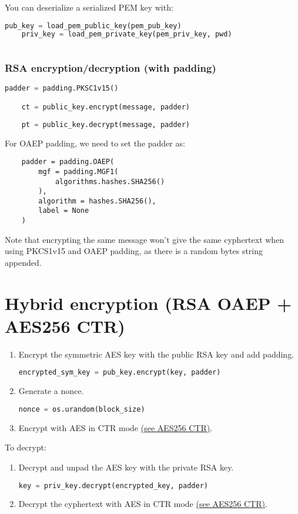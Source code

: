 \documentclass[a4paper, 12 pt]{memoir}
\begin{document}
You can deserialize a serialized PEM key with:
\begin{lstlisting}[language=Python]
    pub_key = load_pem_public_key(pem_pub_key)
    priv_key = load_pem_private_key(pem_priv_key, pwd)
    
\end{lstlisting}

\subsection{RSA encryption/decryption (with padding)}
\begin{lstlisting}[language=Python]
    padder = padding.PKSC1v15()

    ct = public_key.encrypt(message, padder)
    
    pt = public_key.decrypt(message, padder)
\end{lstlisting}

For OAEP padding, we need to set the padder as:
\begin{lstlisting}
    padder = padding.OAEP(
        mgf = padding.MGF1(
            algorithms.hashes.SHA256()
        ),
        algorithm = hashes.SHA256(),
        label = None
    )
\end{lstlisting}

Note that encrypting the same message won't give the same cyphertext when using PKCS1v15 and OAEP padding, as there is a random bytes string appended.

\chapter{Hybrid encryption (RSA OAEP + AES256 CTR)}
\begin{enumerate}
    \item Encrypt the symmetric AES key with the public RSA key and add padding.
    \begin{lstlisting}[language=Python]
        encrypted_sym_key = pub_key.encrypt(key, padder)
    \end{lstlisting}
    \item Generate a nonce.
    \begin{lstlisting}[language=Python]
        nonce = os.urandom(block_size)
    \end{lstlisting}
    \item Encrypt with AES in CTR mode
    \hyperref[sec:AES256 CTR]{(see AES256 CTR)}.
\end{enumerate}

To decrypt: 
\begin{enumerate}
    \item Decrypt and unpad the AES key with the private RSA key.
    \begin{lstlisting}[language=Python]
        key = priv_key.decrypt(encrypted_key, padder)
    \end{lstlisting}
    \item Decrypt the cyphertext with AES in CTR mode
    \hyperref[sec:AES256 CTR]{(see AES256 CTR)}.
\end{enumerate}
\end{document}
